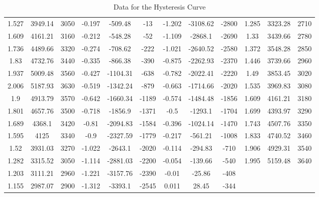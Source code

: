 \begin{table*}
\begin{ruledtabular}
\begin{tabular}{|ccc|ccc|ccc|ccc|}
     1.527 & 3949.14 & 3050 & -0.197 &  -509.48 &   -13 & -1.202 & -3108.62 & -2800 & 1.285 & 3323.28 & 2710\\
     1.609 & 4161.21 & 3160 & -0.212 &  -548.28 &   -52 & -1.109 & -2868.1  & -2690 & 1.33  & 3439.66 & 2780\\
     1.736 & 4489.66 & 3320 & -0.274 &  -708.62 &  -222 & -1.021 & -2640.52 & -2580 & 1.372 & 3548.28 & 2850\\
     1.83  & 4732.76 & 3440 & -0.335 &  -866.38 &  -390 & -0.875 & -2262.93 & -2370 & 1.446 & 3739.66 & 2960\\
     1.937 & 5009.48 & 3560 & -0.427 & -1104.31 &  -638 & -0.782 & -2022.41 & -2220 & 1.49  & 3853.45 & 3020\\
     2.006 & 5187.93 & 3630 & -0.519 & -1342.24 &  -879 & -0.663 & -1714.66 & -2020 & 1.535 & 3969.83 & 3080\\
     1.9   & 4913.79 & 3570 & -0.642 & -1660.34 & -1189 & -0.574 & -1484.48 & -1856 & 1.609 & 4161.21 & 3180\\
     1.801 & 4657.76 & 3500 & -0.718 & -1856.9  & -1371 & -0.5   & -1293.1  & -1704 & 1.699 & 4393.97 & 3290\\
     1.689 & 4368.1  & 3420 & -0.81  & -2094.83 & -1584 & -0.396 & -1024.14 & -1470 & 1.743 & 4507.76 & 3350\\
     1.595 & 4125    & 3340 & -0.9   & -2327.59 & -1779 & -0.217 &  -561.21 & -1008 & 1.833 & 4740.52 & 3460\\
     1.52  & 3931.03 & 3270 & -1.022 & -2643.1  & -2020 & -0.114 &  -294.83 &  -710 & 1.906 & 4929.31 & 3540\\
     1.282 & 3315.52 & 3050 & -1.114 & -2881.03 & -2200 & -0.054 &  -139.66 &  -540 & 1.995 & 5159.48 & 3640\\
     1.203 & 3111.21 & 2960 & -1.221 & -3157.76 & -2390 & -0.01  &   -25.86 &  -408 &       &         &        \\
     1.155 & 2987.07 & 2900 & -1.312 & -3393.1  & -2545 &  0.011 &    28.45 &  -344 &       &         &        \\
    \end{tabular}  
\end{ruledtabular} 
\label{tab:1}
\caption{Data for the Hysteresis Curve}
\end{table*}